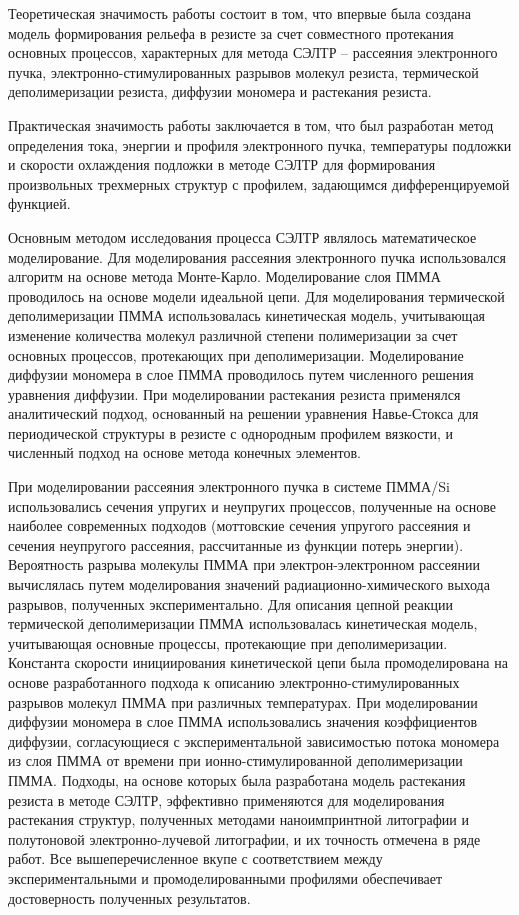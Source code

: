 \influence
Теоретическая значимость работы состоит в том, что впервые была создана модель формирования рельефа в резисте за счет совместного протекания основных процессов, характерных для метода СЭЛТР -- рассеяния электронного пучка, электронно-стимулированных разрывов молекул резиста, термической деполимеризации резиста, диффузии мономера и растекания резиста.


Практическая значимость работы заключается в том, что был разработан метод определения тока, энергии и профиля электронного пучка, температуры подложки и скорости охлаждения подложки в методе СЭЛТР для формирования произвольных трехмерных структур с профилем, задающимся дифференцируемой функцией.


\methods
Основным методом исследования процесса СЭЛТР являлось математическое моделирование. Для моделирования рассеяния электронного пучка использовался алгоритм на основе метода Монте-Карло. Моделирование слоя ПММА проводилось на основе модели идеальной цепи. Для моделирования термической деполимеризации ПММА использовалась кинетическая модель, учитывающая изменение количества молекул различной степени полимеризации за счет основных процессов, протекающих при деполимеризации. Моделирование диффузии мономера в слое ПММА проводилось путем численного решения уравнения диффузии. При моделировании растекания резиста применялся аналитический подход, основанный на решении уравнения Навье-Стокса для периодической структуры в резисте с однородным профилем вязкости, и численный подход на основе метода конечных элементов.


\probation
При моделировании рассеяния электронного пучка в системе ПММА/Si использовались сечения упругих и неупругих процессов, полученные на основе наиболее современных подходов (моттовские сечения упругого рассеяния и сечения неупругого рассеяния, рассчитанные из функции потерь энергии). Вероятность разрыва молекулы ПММА при электрон-электронном рассеянии вычислялась путем моделирования значений радиационно-химического выхода разрывов, полученных экспериментально. Для описания цепной реакции термической деполимеризации ПММА использовалась кинетическая модель, учитывающая основные процессы, протекающие при деполимеризации. Константа скорости инициирования кинетической цепи была промоделирована на основе разработанного подхода к описанию электронно-стимулированных разрывов молекул ПММА при различных температурах. При моделировании диффузии мономера в слое ПММА использовались значения коэффициентов диффузии, согласующиеся с экспериментальной зависимостью потока мономера из слоя ПММА от времени при ионно-стимулированной деполимеризации ПММА. Подходы, на основе которых была разработана модель растекания резиста в методе СЭЛТР, эффективно применяются для моделирования растекания структур, полученных методами наноимпринтной литографии и полутоновой электронно-лучевой литографии, и их точность отмечена в ряде работ. Все вышеперечисленное вкупе с соответствием между экспериментальными и промоделированными профилями обеспечивает достоверность полученных результатов.

